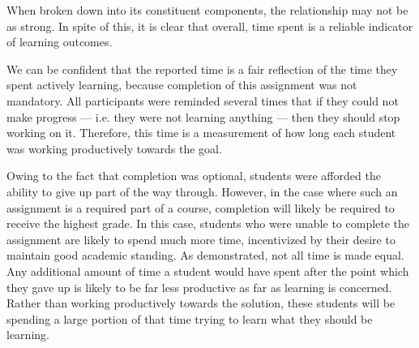         When broken down into its constituent components, the relationship may not be as strong.
        In spite of this, it is clear that overall, time spent is a reliable indicator of learning outcomes.

        We can be confident that the reported time is a fair reflection of the time they spent actively learning, because completion of this assignment was not mandatory. 
        All participants were reminded several times that if they could not make progress --- 
        i.e. they were not learning anything --- then they should stop working on it. 
        Therefore, this time is a measurement of how long each student was working productively towards the goal. 

        Owing to the fact that completion was optional, students were afforded the ability to give up part of the way through. 
        However, in the case where such an assignment is a required part of a course, completion will likely be required to receive the highest grade. 
        In this case, students who were unable to complete the assignment are likely to spend much more time, incentivized by their desire to maintain good academic standing. 
        As \citeauthor{Z-Zeng} demonstrated, not all time is made equal. 
        Any additional amount of time a student would have spent after the point which they gave up is likely to be far less productive as far as learning is concerned. 
        Rather than working productively towards the solution, these students will be spending a large portion of that time trying to learn what they should be learning.


